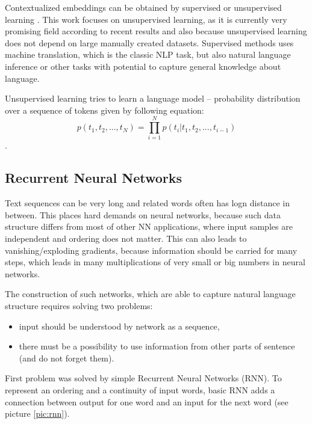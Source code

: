 Contextualized embeddings can be obtained by supervised or unsupervised learning \citep{Liu2020}. This work focuses on unsupervised learning, as it is currently very promising field according to recent results and also because unsupervised learning does not depend on large manually created datasets. Supervised methods uses machine translation, which is the classic NLP task, but also natural language inference or other tasks with potential to capture general knowledge about language.

Unsupervised learning tries to learn a language model -- probability distribution over a sequence of tokens given by following equation:
 \begin{equation*}
  p(t_1, t_2,...,t_N) =\prod_{i=1}^{N} p(t_i | t_1, t_2, ..., t_{i-1})
\end{equation*}.



\subsection{Recurrent Neural Networks}
\label{sub:RNN}
Text sequences can be very long and related words often has logn distance in between. This places hard demands on neural networks, because such data structure differs from most of other NN applications, where input samples are independent and ordering does not matter. This can also leads to vanishing/exploding gradients, because information should be carried for many steps, which leads in many multiplications of very small or big numbers in neural networks.

The construction of such networks, which are able to capture natural language structure requires solving two problems:
\begin{itemize}
\item input should be understood by network as a sequence,
\item there must be a possibility to use information from other parts of sentence (and do not forget them).
\end{itemize}
 First problem was solved by simple Recurrent Neural Networks (RNN). To represent an ordering and a continuity of input words, basic RNN adds a connection between output for one word and an input for the next word (see picture \ref{pic:rnn}). 
 
